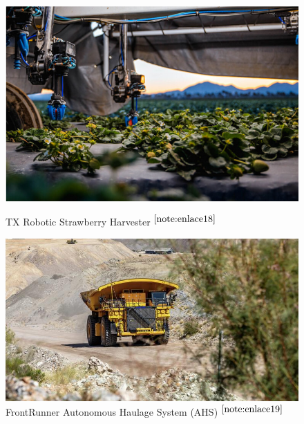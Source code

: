 \begin{figure}[ht!]
	\centering
	\begin{minipage}{0.3\linewidth}
		\centering
		\includegraphics[width=\linewidth]{figs/strawberry.png}
		\caption*{\centering TX Robotic Strawberry Harvester $^{\ref{note:enlace18}}$ }
	\end{minipage}
	\hspace{3 cm}
	\begin{minipage}{0.3\linewidth}
		\centering
		\includegraphics[width=\linewidth]{figs/komatsu.jpeg}
		\caption*{\centering FrontRunner Autonomous Haulage System (AHS) $^{\ref{note:enlace19}}$ }
	\end{minipage}
	\hspace{3cm}
	\begin{minipage}{0.3\linewidth}
		\centering

\end{minipage}
\end{figure}
